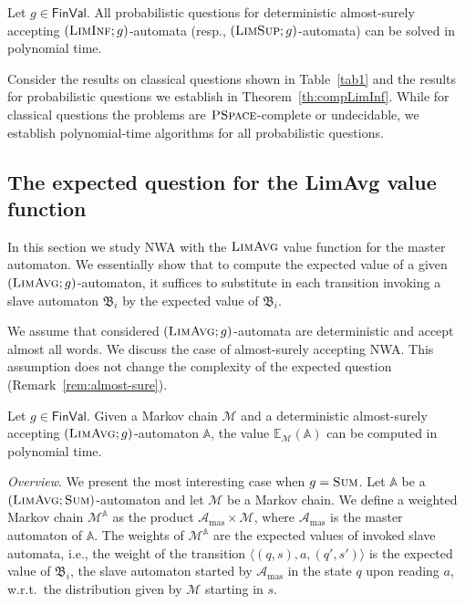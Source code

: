 \documentclass{lmcs}
\newcommand{\masterA}{\mathcal{A}_{\textrm{mas}}}
\newcommand{\nestedA}{\mathbb{A}}
\newcommand{\slaveA}{{\mathfrak{B}}}
\newcommand{\PSPACE}{\textsc{PSpace}{}}
\newcommand{\MCfromNested}{\markov^{\nestedA}}
\newcommand{\tuple}[1]{\langle#1\rangle}
\newcommand{\fsum}{\textsc{Sum}}
\newcommand{\flimavg}{\textsc{LimAvg}}
\newcommand{\fliminf}{\textsc{LimInf}}
\newcommand{\flimsup}{\textsc{LimSup}}
\newcommand{\FinVal}{\mathsf{FinVal}}
\newcommand{\expected}{\mathbb{E}}
\newcommand{\markov}{\mathcal{M}}
\begin{document}
\begin{thm}\label{th:compLimInf}
Let $g \in \FinVal$.
All probabilistic questions for deterministic almost-surely accepting $(\fliminf; g)$-automata (resp., $(\flimsup; g)$-automata)
can be solved in polynomial time.
\end{thm}

\begin{rem}\label{remark:LimInf-classical-vs-probabilistic}
Consider the results on classical questions shown in Table~\ref{tab1} and the results for
probabilistic questions we establish in Theorem~\ref{th:compLimInf}.
While for classical questions the problems are $\PSPACE$-complete or
undecidable, we establish polynomial-time algorithms for all probabilistic questions.
\end{rem}

\subsection{The expected question for the LimAvg value function}\label{s:limavg}

In this section we study NWA with the $\flimavg$ value function for the master automaton.
We essentially show that to compute the expected value of a given $(\flimavg;g)$-automaton, it suffices to
substitute in each transition invoking a slave automaton $\slaveA_i$ by the expected value of $\slaveA_i$.

We assume that considered $(\flimavg;g)$-automata are deterministic and accept almost all words.
We discuss the case of almost-surely accepting NWA\@.
This assumption does not change the complexity of the expected question (Remark~\ref{rem:almost-sure}).


\begin{lem}\label{l:limavg-poly}
Let $g \in \FinVal$.
Given a Markov chain $\markov$ and a deterministic almost-surely accepting $(\flimavg;g)$-automaton $\nestedA$, the value $\expected_{\markov}(\nestedA)$ can be computed in polynomial time.
\end{lem}


\noindent\emph{Overview}.
We present the most interesting case when $g=\fsum$.
Let $\nestedA$ be a $(\flimavg;\fsum)$-automaton and let $\markov$ be a Markov chain.
We define a weighted Markov chain $\MCfromNested$ as the product $\masterA \times \markov$,
where $\masterA$ is the master automaton of $\nestedA$.
The weights of  $\MCfromNested$ are  the expected values of invoked slave automata, i.e.,
the weight of the transition $\tuple{(q,s),a,(q',s')}$ is the expected value of $\slaveA_i$,
the slave automaton started by $\masterA$ in the state $q$ upon reading $a$, w.r.t.\ the distribution given by $\markov$ starting in $s$.
\end{document}
